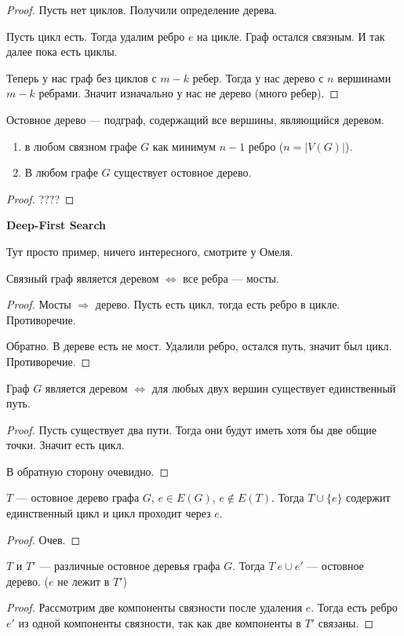 \begin{proof}
    Пусть нет циклов. Получили определение дерева.

    Пусть цикл есть. Тогда удалим ребро $e$ на цикле. Граф остался связным. И так далее пока есть циклы.

    Теперь у нас граф без циклов с  $m-k$ ребер. Тогда у нас дерево с  $n$ вершинами  $m-k$ ребрами. Значит изначально у нас не дерево (много ребер).
\end{proof}
\begin{definition}
    Остовное дерево --- подграф, содержащий все вершины, являющийся деревом.
\end{definition}
\begin{consequence}
    \slashn
    \begin{enumerate}
        \item в любом связном графе $G$ как минимум  $n-1$ ребро ($n = |V(G)|$).
        \item В любом графе $G$ существует остовное дерево.
    \end{enumerate}
\end{consequence}
\begin{proof}
    ????
\end{proof}

\textbf{Deep-First Search}

Тут просто пример, ничего интересного, смотрите у Омеля.
\begin{statement}
Связный граф является деревом $\iff$ все ребра --- мосты.    
\end{statement}
\begin{proof}
    Мосты $\Rightarrow$ дерево. Пусть есть цикл, тогда есть ребро в цикле. Противоречие.

    Обратно. В дереве есть не мост. Удалили ребро, остался путь, значит был цикл. Противоречие.
\end{proof}
\begin{statement}
    Граф $G$ является деревом  $\iff$ для любых двух вершин существует единственный путь.
\end{statement}
\begin{proof}
    Пусть существует два пути. Тогда они будут иметь хотя бы две общие точки. Значит есть цикл.

    В обратную сторону очевидно.
\end{proof}
\begin{consequence}
    $T$ --- остовное дерево графа  $G$,  $e \in E(G)$, $e \not \in E(T)$. Тогда  $T \cup \{e\}$ содержит единственный цикл и цикл проходит через  $e$.
\end{consequence}
\begin{proof}
    Очев.
\end{proof}
\begin{statement}
    $T$ и  $T'$ --- различные остовное деревья графа  $G$. Тогда $T \ e \cup e'$ --- остовное дерево. ($e$ не лежит в  $T'$)
\end{statement}
\begin{proof}
    Рассмотрим две компоненты связности после удаления $e$. Тогда есть ребро $e'$ из одной компоненты связности, так как две компоненты в $T'$ связаны.
\end{proof}
